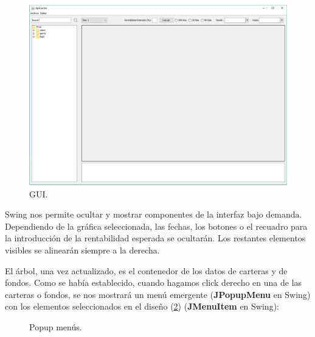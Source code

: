 \documentclass[12pt, a4paper]{book}
\begin{document}
\begin{figure}[htbp]
	\centering
	\includegraphics[width=\textwidth]{figuras/gui2.PNG}
	\caption{GUI.}
	\label{fig:gui2}
	\end {figure}

Swing nos permite ocultar y mostrar componentes de la interfaz bajo demanda. Dependiendo de la gráfica seleccionada, las fechas, los botones o el recuadro para la introducción de la rentabilidad esperada se ocultarán. Los restantes elementos visibles se alinearán siempre a la derecha.\\
\newpage

El árbol, una vez actualizado, es el contenedor de los datos de carteras y de fondos. Como se había establecido, cuando hagamos click derecho en una de las carteras o fondos, se nos mostrará un menú emergente (\textbf{JPopupMenu} en Swing) con los elementos seleccionados en el diseño (\ref{fig:menucartera}) (\textbf{JMenuItem} en Swing):

	
	\begin{figure}[htbp]
		\centering
		\caption{Popup menús.} \label{fig:menucartera}
	\end{figure}
\end{document}
